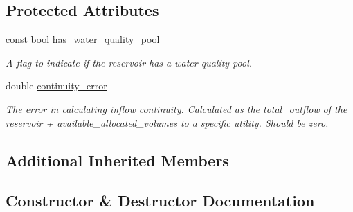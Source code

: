 \subsection*{Protected Attributes}
\begin{DoxyCompactItemize}
\item 
const bool \mbox{\hyperlink{classAllocatedReservoir_af6a1924f60de19b7f77781af0419c39b}{has\+\_\+water\+\_\+quality\+\_\+pool}}
\begin{DoxyCompactList}\small\item\em A flag to indicate if the reservoir has a water quality pool. \end{DoxyCompactList}\item 
double \mbox{\hyperlink{classAllocatedReservoir_ae34d7123ff096d676609e32ba4b83e47}{continuity\+\_\+error}}
\begin{DoxyCompactList}\small\item\em The error in calculating inflow continuity. Calculated as the total\+\_\+outflow of the reservoir + available\+\_\+allocated\+\_\+volumes to a specific utility. Should be zero. \end{DoxyCompactList}\end{DoxyCompactItemize}
\subsection*{Additional Inherited Members}


\subsection{Constructor \& Destructor Documentation}
\mbox{\label{classAllocatedReservoir_a0b2d620a1d1fe9a9fe053269f35a9a70}} 
